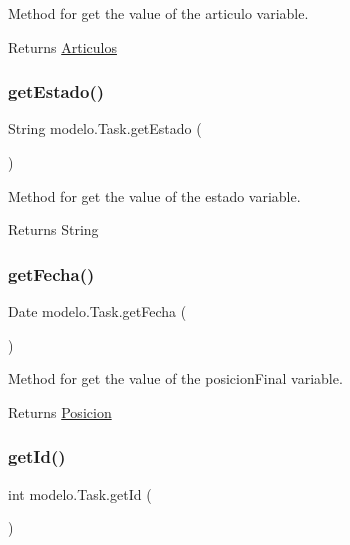 Method for get the value of the articulo variable. 

\begin{DoxyReturn}{Returns}
\mbox{\hyperlink{classmodelo_1_1_articulos}{Articulos}} 
\end{DoxyReturn}
\mbox{\label{classmodelo_1_1_task_aaa504f1dfffb4eeba7bbe4904be070b5}} 
\subsubsection{\texorpdfstring{get\+Estado()}{getEstado()}}
{\footnotesize\ttfamily String modelo.\+Task.\+get\+Estado (\begin{DoxyParamCaption}{ }\end{DoxyParamCaption})}



Method for get the value of the estado variable. 

\begin{DoxyReturn}{Returns}
String 
\end{DoxyReturn}
\mbox{\label{classmodelo_1_1_task_ac1c34ccbefefc2485356474f6655fc3f}} 
\subsubsection{\texorpdfstring{get\+Fecha()}{getFecha()}}
{\footnotesize\ttfamily Date modelo.\+Task.\+get\+Fecha (\begin{DoxyParamCaption}{ }\end{DoxyParamCaption})}



Method for get the value of the posicion\+Final variable. 

\begin{DoxyReturn}{Returns}
\mbox{\hyperlink{classmodelo_1_1_posicion}{Posicion}} 
\end{DoxyReturn}
\mbox{\label{classmodelo_1_1_task_afc746b903e969188b0ad624bb0691590}} 
\subsubsection{\texorpdfstring{get\+Id()}{getId()}}
{\footnotesize\ttfamily int modelo.\+Task.\+get\+Id (\begin{DoxyParamCaption}{ }\end{DoxyParamCaption})}



